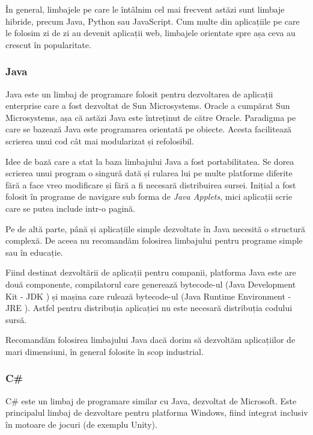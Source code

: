 În general, limbajele pe care le întâlnim cel mai frecvent astăzi sunt limbaje
hibride, precum Java, Python sau JavaScript. Cum multe din aplicațiile pe care
le folosim zi de zi au devenit aplicații web, limbajele orientate spre așa ceva
au crescut în popularitate.

\subsubsection{Java}
\label{sec:appdev-langs-hybrid-ex-java}

Java este un limbaj de programare folosit pentru dezvoltarea de aplicații
enterprise care a fost dezvoltat de Sun Microsystems. Oracle a cumpărat Sun
Microsystems, așa că astăzi Java este întreținut de către Oracle. Paradigma pe
care se bazează Java este programarea orientată pe obiecte. Acesta facilitează
scrierea unui cod cât mai modularizat și refolosibil.

Idee de bază care a stat la baza limbajului Java a fost portabilitatea. Se dorea
scrierea unui program o singură dată și rularea lui pe multe platforme diferite
fără a face vreo modificare și fără a fi necesară distribuirea sursei. Inițial a
fost folosit în programe de navigare sub forma de \textit{Java Applets}, mici
aplicații scrie care se putea include intr-o pagină.

Pe de altă parte, până și aplicațiile simple dezvoltate în Java necesită o
structură complexă. De aceea nu recomandăm folosirea limbajului pentru programe
simple sau în educație.

Fiind destinat dezvoltării de aplicații pentru companii, platforma Java este are
două componente, compilatorul care generează bytecode-ul (Java Development Kit -
JDK ) și mașina care rulează bytecode-ul (Java
Runtime Environment - JRE ). Astfel pentru
distribuția aplicației nu este necesară distribuția codului sursă.

Recomandăm folosirea limbajului Java dacă dorim să dezvoltăm aplicațiilor de
mari dimensiuni, în general folosite în scop industrial.

\subsubsection{C\#}
\label{sec:appdev-langs-hybrid-ex-cs}

C\# este un limbaj de programare similar cu Java, dezvoltat de Microsoft. Este
principalul limbaj de dezvoltare pentru platforma Windows, fiind integrat
inclusiv în motoare de jocuri (de exemplu Unity).

